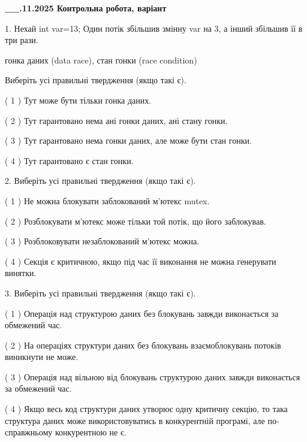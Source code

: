 \documentclass[12pt, ukrainian]{article}
\begin{document}
\newpage
\begin {large}

\textbf{\_\_.11.2025 Контрольна робота, варіант  }\par


{
1. Нехай int var=13; Один потік збільшив змінну var на 3, а інший збільшив її в три рази.

гонка даних (data race), стан гонки (race condition)

Виберіть усі правильні твердження (якщо такі є).\par
\vspace{2mm}
( 1 ) Тут може бути тільки гонка даних.%

( 2 ) Тут гарантовано нема ані гонки даних, ані стану гонки.%

( 3 ) Тут гарантовано нема гонки даних, але може бути стан гонки.%

( 4 ) Тут гарантовано є стан гонки.%


2. Виберіть усі правильні твердження (якщо такі є).\par
\vspace{2mm}

( 1 ) Не можна блокувати заблокований м’ютекс mutex.%

( 2 ) Розблокувати м’ютекс може тільки той потік, що його заблокував.%

( 3 ) Розблоковувати незаблокований м’ютекс можна.%

( 4 ) Секція є критичною, якщо під час її виконання не можна генерувати винятки.%


3. Виберіть усі правильні твердження (якщо такі є).\par
\vspace{2mm}

( 1 ) Операція над структурою даних без блокувань завжди виконається за обмежений час.%

( 2 ) На операціях структури даних без блокувань взаємоблокувань потоків виникнути не може.%

( 3 ) Операція над вільною від блокувань структурою даних завжди виконається за обмежений час.%

( 4 ) Якщо весь код структури даних утворює одну критичну секцію, то така структура даних може використовуватись в конкурентній програмі, але по-справжньо\-му конкурентною не є.%


}
\end{large}
\end{document}
